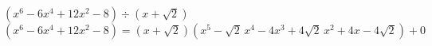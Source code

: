 {$\left(x^6-6x^4+12x^2-8\right) \div \left(x +\sqrt{2} \right)$}
{$\left(x^6-6x^4+12x^2-8\right) = \left(x +\sqrt{2} \right) \left(x^5-\sqrt{2} \, x^4-4x^3+4\sqrt{2} \, x^2+4x-4\sqrt{2}\right) + 0$}